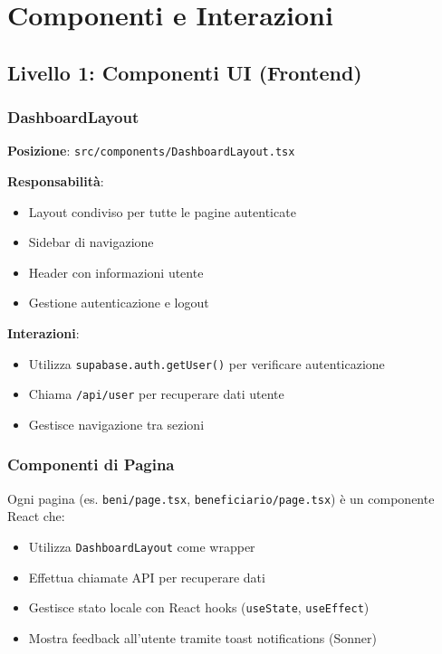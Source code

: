 \documentclass{article}
\begin{document}
\section{Componenti e Interazioni}

\subsection{Livello 1: Componenti UI (Frontend)}

\subsubsection{DashboardLayout}
\textbf{Posizione}: \texttt{src/components/DashboardLayout.tsx}

\textbf{Responsabilità}:
\begin{itemize}
\item Layout condiviso per tutte le pagine autenticate
\item Sidebar di navigazione
\item Header con informazioni utente
\item Gestione autenticazione e logout
\end{itemize}

\textbf{Interazioni}:
\begin{itemize}
\item Utilizza \texttt{supabase.auth.getUser()} per verificare autenticazione
\item Chiama \texttt{/api/user} per recuperare dati utente
\item Gestisce navigazione tra sezioni
\end{itemize}

\subsubsection{Componenti di Pagina}
Ogni pagina (es. \texttt{beni/page.tsx}, \texttt{beneficiario/page.tsx}) è un componente React che:
\begin{itemize}
\item Utilizza \texttt{DashboardLayout} come wrapper
\item Effettua chiamate API per recuperare dati
\item Gestisce stato locale con React hooks (\texttt{useState}, \texttt{useEffect})
\item Mostra feedback all'utente tramite toast notifications (Sonner)
\end{itemize}
\end{document}
